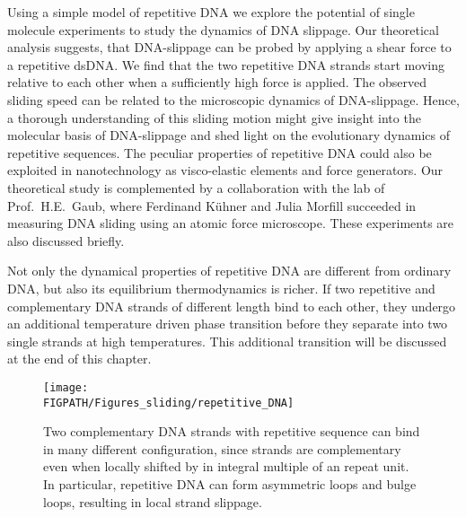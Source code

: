 Using a simple model
of repetitive DNA we explore the potential of single molecule experiments to study the dynamics of DNA 
slippage. Our theoretical analysis suggests, that DNA-slippage can be probed by applying a shear force to a 
repetitive dsDNA. We find that the two repetitive DNA strands start moving relative
to each other when a sufficiently high force is applied. The observed sliding speed 
can be related to the microscopic dynamics of DNA-slippage. 
Hence, a thorough understanding of this sliding motion might give insight into 
 the molecular basis of DNA-slippage and shed light on the evolutionary dynamics
of repetitive sequences. The peculiar properties of repetitive DNA could also be exploited
in nanotechnology as visco-elastic elements and force generators. 
Our theoretical study is complemented by a collaboration with 
 the lab of Prof.~H.E.~Gaub, where Ferdinand K\"uhner and Julia Morfill succeeded in 
measuring DNA sliding using an atomic force microscope. These experiments are also discussed briefly.

Not only the  dynamical properties of repetitive DNA are different from ordinary DNA, but also 
its equilibrium thermodynamics is richer. If two repetitive and complementary DNA strands
of different length bind to each other, they undergo an additional temperature driven phase 
transition before they separate into two single strands at high temperatures. 
This additional transition will be discussed at the end of this chapter.

\begin{figure}
\centering
\texttt{[image: \\FIGPATH/Figures\_sliding/repetitive\_DNA]}
\caption[Repetitive DNA has many binding configurations.]
{\label{fig:repetitive_DNA}
Two complementary DNA strands with repetitive sequence can bind in many different 
configuration, since strands are complementary even when locally shifted by in integral multiple of an 
repeat unit. In particular, repetitive DNA can form asymmetric loops and bulge loops, resulting in local strand slippage.
}
\end{figure}

